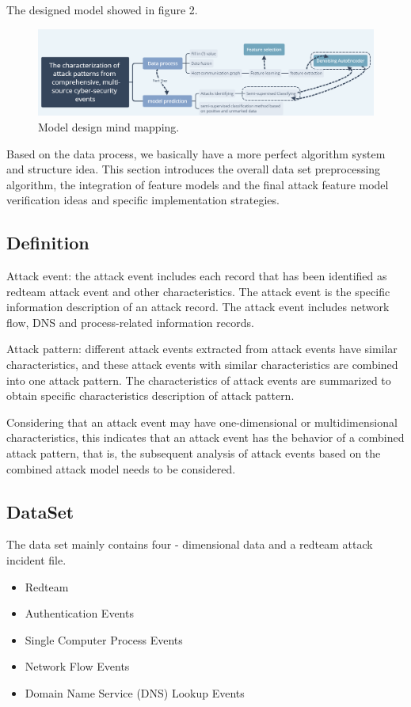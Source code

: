 \documentclass[12pt,journal,draftcls,doublespace, letterpaper,onecolumn]{IEEEtran}
\begin{document}
The designed model showed in figure 2.

\begin{figure}[htbp]
	\includegraphics [width=1\textwidth]{2.png}
	\caption{ Model design mind mapping.}
	\label{fig}
\end{figure}

Based on the data process, we basically have a more perfect algorithm system and structure idea. This section introduces the overall data set preprocessing algorithm, the integration of feature models and the final attack feature model verification ideas and specific implementation strategies.

\subsection{Definition}
Attack event: the attack event includes each record that has been identified as redteam attack event and other characteristics. The attack event is the specific information description of an attack record. The attack event includes network flow, DNS and process-related information records.

Attack pattern: different attack events extracted from attack events have similar characteristics, and these attack events with similar characteristics are combined into one attack pattern. The characteristics of attack events are summarized to obtain specific characteristics description of attack pattern.

Considering that an attack event may have one-dimensional or multidimensional characteristics, this indicates that an attack event has the behavior of a combined attack pattern, that is, the subsequent analysis of attack events based on the combined attack model needs to be considered.

\subsection{DataSet}

The data set mainly contains four - dimensional data and a redteam attack incident file.


\begin{itemize}
	\item Redteam
	\item Authentication Events
	\item Single Computer Process Events
	\item Network Flow Events
	\item Domain Name Service (DNS) Lookup Events
\end{itemize}
\end{document}
